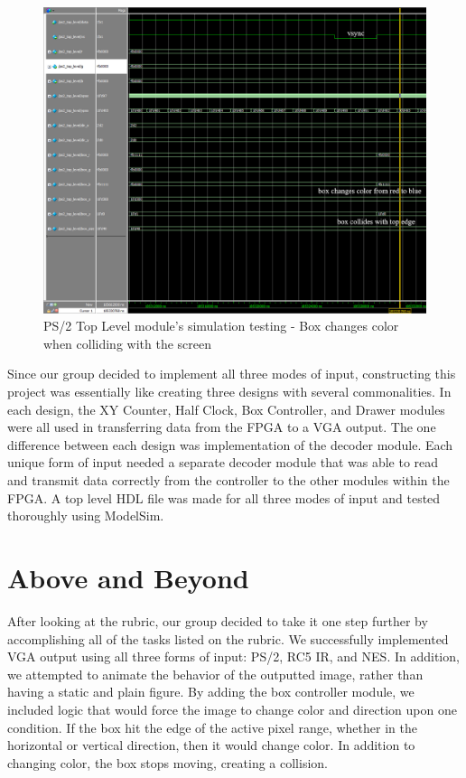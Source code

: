 \documentclass[12pt]{article}
\numberwithin{figure}{subsection}
\begin{document}
\newpage

\begin{figure}[ht]
  \centering
  \includegraphics[width=\textwidth]{ps2_top_level_simulation_box_changes_color_collision.png}
  \caption{PS/2 Top Level module’s simulation testing - Box changes color when colliding with the screen}
  \label{fig:ps2_top_level_simulation_box_changes_color_collision}
\end{figure}

Since our group decided to implement all three modes of input, constructing this project was essentially like creating three designs with several commonalities. In each design, the XY Counter, Half Clock, Box Controller, and Drawer modules were all used in transferring data from the FPGA to a VGA output. The one difference between each design was implementation of the decoder module. Each unique form of input needed a separate decoder module that was able to read and transmit data correctly from the controller to the other modules within the FPGA. A top level HDL file was made for all three modes of input and tested thoroughly using ModelSim.

\section{Above and Beyond}

After looking at the rubric, our group decided to take it one step further by accomplishing all of the tasks listed on the rubric. We successfully implemented VGA output using all three forms of input: PS/2, RC5 IR, and NES. In addition, we attempted to animate the behavior of the outputted image, rather than having a static and plain figure. By adding the box controller module, we included logic that would force the image to change color and direction upon one condition. If the box hit the edge of the active pixel range, whether in the horizontal or vertical direction, then it would change color. In addition to changing color, the box stops moving, creating a collision.
\end{document}
